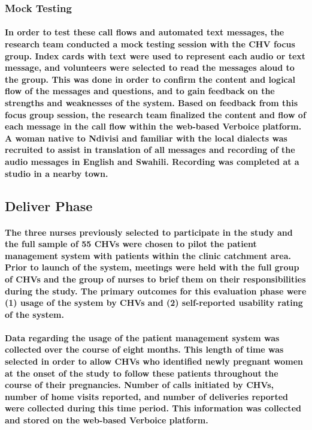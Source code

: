 \subsubsection{Mock Testing}
\paragraph{In order to test these call flows and automated text messages, the research team conducted a mock testing session with the CHV focus group. Index cards with text were used to represent each audio or text message, and volunteers were selected to read the messages aloud to the group. This was done in order to confirm the content and logical flow of the messages and questions, and to gain feedback on the strengths and weaknesses of the system. Based on feedback from this focus group session, the research team finalized the content and flow of each message in the call flow within the web-based Verboice platform. A woman native to Ndivisi and familiar with the local dialects was recruited to assist in translation of all messages and recording of the audio messages in English and Swahili. Recording was completed at a studio in a nearby town.}


\subsection{Deliver Phase}
\paragraph{The three nurses previously selected to participate in the study and the full sample of 55 CHVs were chosen to pilot the patient management system with patients within the clinic catchment area. Prior to launch of the system, meetings were held with the full group of CHVs and the group of nurses to brief them on their responsibilities during the study. The primary outcomes for this evaluation phase were (1) usage of the system by CHVs and (2) self-reported usability rating of the system.}

\paragraph{Data regarding the usage of the patient management system  was collected over the course of eight months. This length of time was selected in order to allow CHVs who identified newly pregnant women at the onset of the study to follow these patients throughout the course of their pregnancies. Number of calls initiated by CHVs, number of home visits reported, and number of deliveries reported were collected during this time period. This information was collected and stored on the web-based Verboice platform.}

